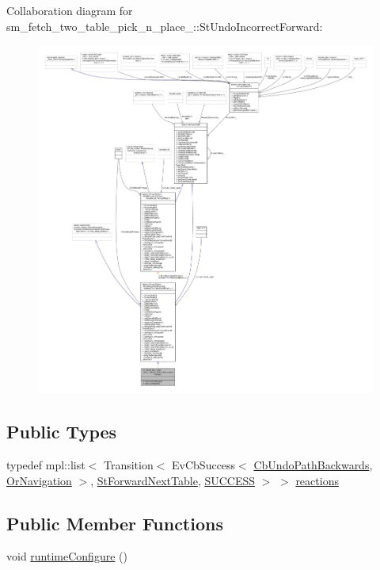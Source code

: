 Collaboration diagram for sm\+\_\+fetch\+\_\+two\+\_\+table\+\_\+pick\+\_\+n\+\_\+place\+\_\+:\+:St\+Undo\+Incorrect\+Forward\+:
\nopagebreak
\begin{figure}[H]
\begin{center}
\leavevmode
\includegraphics[width=350pt]{structsm__fetch__two__table__pick__n__place__1_1_1StUndoIncorrectForward__coll__graph}
\end{center}
\end{figure}
\subsection*{Public Types}
\begin{DoxyCompactItemize}
\item 
typedef mpl\+::list$<$ Transition$<$ Ev\+Cb\+Success$<$ \hyperlink{classcl__move__base__z_1_1CbUndoPathBackwards}{Cb\+Undo\+Path\+Backwards}, \hyperlink{classsm__fetch__two__table__pick__n__place__1_1_1OrNavigation}{Or\+Navigation} $>$, \hyperlink{structsm__fetch__two__table__pick__n__place__1_1_1StForwardNextTable}{St\+Forward\+Next\+Table}, \hyperlink{classSUCCESS}{S\+U\+C\+C\+E\+SS} $>$ $>$ \hyperlink{structsm__fetch__two__table__pick__n__place__1_1_1StUndoIncorrectForward_a04362f45e5a504688c0df0c8c199d6d5}{reactions}
\end{DoxyCompactItemize}
\subsection*{Public Member Functions}
\begin{DoxyCompactItemize}
\item 
void \hyperlink{structsm__fetch__two__table__pick__n__place__1_1_1StUndoIncorrectForward_aaa4dff976ff5e0e8123de92b361f56ba}{runtime\+Configure} ()
\end{DoxyCompactItemize}

